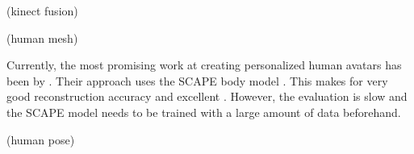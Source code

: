 (kinect fusion)
\citep{izadi2011kinectfusion}
\citep{newcombe2011kinectfusion}
\citep{Whelan12rssw}

(human mesh)

Currently, the most promising work at creating personalized human avatars has been by \citet{weiss2011home}. Their approach uses the SCAPE body model \citep{anguelov2005scape}. This makes for very good reconstruction accuracy and excellent . However, the evaluation is slow and the SCAPE model needs to be trained with a large amount of data beforehand.

\citep{schneider2010fitting}
\citep{ahmed2005automatic}
\citep{tongscanning}
\citep{charpentier2011accurate}
\citep{hirshbergc2011evaluating}

(human pose)
\citep{baak2011data}

